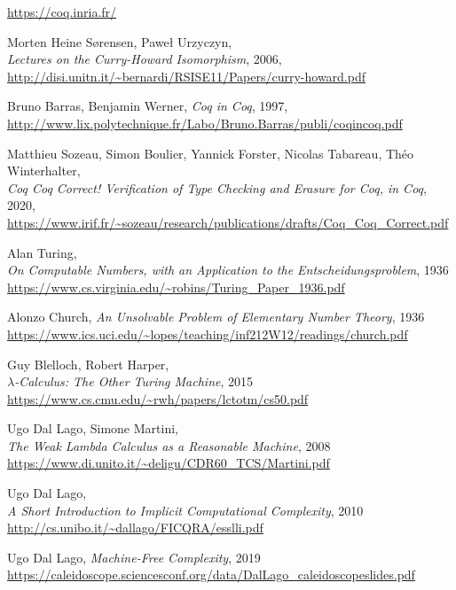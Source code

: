 \documentclass[declaration,mgr,english,shortabstract]{iithesis}
\begin{document}
\begin{thebibliography}{1}
    \url{https://coq.inria.fr/}

    Morten Heine Sørensen, Paweł Urzyczyn, \\
    \textit{Lectures on the Curry-Howard Isomorphism}, 2006, \\
    \url{http://disi.unitn.it/~bernardi/RSISE11/Papers/curry-howard.pdf}

    Bruno Barras, Benjamin Werner, \textit{Coq in Coq}, 1997, \\
    \url{http://www.lix.polytechnique.fr/Labo/Bruno.Barras/publi/coqincoq.pdf}

    Matthieu Sozeau, Simon Boulier, Yannick Forster, Nicolas Tabareau, Théo Winterhalter, \\
    \textit{Coq Coq Correct! Verification of Type Checking and Erasure for Coq, in Coq}, 2020, \\
    \url{https://www.irif.fr/~sozeau/research/publications/drafts/Coq_Coq_Correct.pdf}

    Alan Turing, \\
    \textit{On Computable Numbers, with an Application to the Entscheidungsproblem}, 1936 \\
    \url{https://www.cs.virginia.edu/~robins/Turing_Paper_1936.pdf}

    Alonzo Church, \textit{An Unsolvable Problem of Elementary Number Theory}, 1936 \\
    \url{https://www.ics.uci.edu/~lopes/teaching/inf212W12/readings/church.pdf}

    Guy Blelloch, Robert Harper, \\
    \textit{$\lambda$-Calculus: The Other Turing Machine}, 2015 \\
    \url{https://www.cs.cmu.edu/~rwh/papers/lctotm/cs50.pdf}

    Ugo Dal Lago, Simone Martini, \\
    \textit{The Weak Lambda Calculus
    as a Reasonable Machine}, 2008 \\
    \url{https://www.di.unito.it/~deligu/CDR60_TCS/Martini.pdf}

    Ugo Dal Lago, \\
    \textit{A Short Introduction to Implicit Computational Complexity}, 2010 \\
    \url{http://cs.unibo.it/~dallago/FICQRA/esslli.pdf}

    Ugo Dal Lago,
    \textit{Machine-Free Complexity},
    2019 \\
    \url{https://caleidoscope.sciencesconf.org/data/DalLago_caleidoscopeslides.pdf}


\end{thebibliography}
\end{document}
